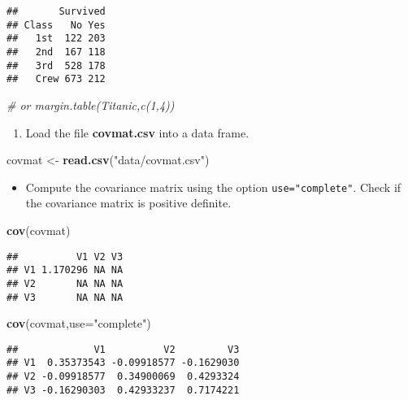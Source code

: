 \documentclass[]{article}
\newenvironment{Shaded}{\begin{snugshade}}{\end{snugshade}}
\newcommand{\KeywordTok}[1]{\textcolor[rgb]{0.13,0.29,0.53}{\textbf{#1}}}
\newcommand{\DataTypeTok}[1]{\textcolor[rgb]{0.13,0.29,0.53}{#1}}
\newcommand{\StringTok}[1]{\textcolor[rgb]{0.31,0.60,0.02}{#1}}
\newcommand{\CommentTok}[1]{\textcolor[rgb]{0.56,0.35,0.01}{\textit{#1}}}
\newcommand{\NormalTok}[1]{#1}
\providecommand{\tightlist}{%
  \setlength{\itemsep}{0pt}\setlength{\parskip}{0pt}}
\begin{document}
\begin{verbatim}
##       Survived
## Class   No Yes
##   1st  122 203
##   2nd  167 118
##   3rd  528 178
##   Crew 673 212
\end{verbatim}

\begin{Shaded}
\begin{Highlighting}[]
\CommentTok{# or margin.table(Titanic,c(1,4))}
\end{Highlighting}
\end{Shaded}

\begin{enumerate}
\def\labelenumi{\arabic{enumi}.}
\setcounter{enumi}{1}
\tightlist
\item
  Load the file \textbf{covmat.csv} into a data frame.
\end{enumerate}

\begin{Shaded}
\begin{Highlighting}[]
\NormalTok{covmat <-}\StringTok{ }\KeywordTok{read.csv}\NormalTok{(}\StringTok{"data/covmat.csv"}\NormalTok{)}
\end{Highlighting}
\end{Shaded}

\begin{itemize}
\tightlist
\item
  Compute the covariance matrix using the option
  \texttt{use="complete"}. Check if the covariance matrix is positive
  definite.
\end{itemize}

\begin{Shaded}
\begin{Highlighting}[]
\KeywordTok{cov}\NormalTok{(covmat)}
\end{Highlighting}
\end{Shaded}

\begin{verbatim}
##          V1 V2 V3
## V1 1.170296 NA NA
## V2       NA NA NA
## V3       NA NA NA
\end{verbatim}

\begin{Shaded}
\begin{Highlighting}[]
\KeywordTok{cov}\NormalTok{(covmat,}\DataTypeTok{use=}\StringTok{"complete"}\NormalTok{)}
\end{Highlighting}
\end{Shaded}

\begin{verbatim}
##             V1          V2         V3
## V1  0.35373543 -0.09918577 -0.1629030
## V2 -0.09918577  0.34900069  0.4293324
## V3 -0.16290303  0.42933237  0.7174221
\end{verbatim}
\end{document}
